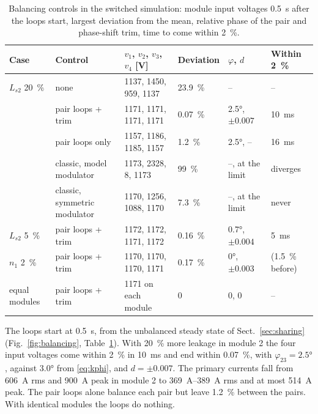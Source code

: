 \documentclass[10pt,a4paper]{scrartcl}
\begin{document}
\begin{onehalfspace}
\begin{table}[!htb]
\centering
\caption{Balancing controls in the switched simulation: module input voltages \SI{0.5}{s} after the loops start, largest deviation from the mean, relative phase of the pair and phase-shift trim, time to come within \SI{2}{\percent}.}
\label{tab:balancing}
\small
\begin{tabular}{@{}llllll@{}}
\toprule
Case & Control & $v_1$, $v_2$, $v_3$, $v_4$ [V] & Deviation & $\varphi$, $d$ & Within \SI{2}{\percent} \\
\midrule
$L_{s2}$ \SI{+20}{\percent} & none & 1137, 1450, 959, 1137 & \SI{23.9}{\percent} & -- & -- \\
 & pair loops + trim & 1171, 1171, 1171, 1171 & \SI{0.07}{\percent} & \ang{2.5}, $\pm 0.007$ & \SI{10}{ms} \\
 & pair loops only & 1157, 1186, 1185, 1157 & \SI{1.2}{\percent} & \ang{2.5}, -- & \SI{16}{ms} \\
 & classic, model modulator & 1173, 2328, 8, 1173 & \SI{99}{\percent} & --, at the limit & diverges \\
 & classic, symmetric modulator & 1170, 1256, 1088, 1170 & \SI{7.3}{\percent} & --, at the limit & never \\
$L_{s2}$ \SI{+5}{\percent} & pair loops + trim & 1172, 1172, 1171, 1172 & \SI{0.16}{\percent} & \ang{0.7}, $\pm 0.004$ & \SI{5}{ms} \\
$n_1$ \SI{+2}{\percent} & pair loops + trim & 1170, 1170, 1170, 1171 & \SI{0.17}{\percent} & \ang{0}, $\pm 0.003$ & (\SI{1.5}{\percent} before) \\
equal modules & pair loops + trim & 1171 on each module & 0 & 0, 0 & -- \\
\bottomrule
\end{tabular}
\end{table}

The loops start at \SI{0.5}{s}, from the unbalanced steady state of Sect.~\ref{sec:sharing} (Fig.~\ref{fig:balancing}, Table~\ref{tab:balancing}). With \SI{20}{\percent} more leakage in module 2 the four input voltages come within \SI{2}{\percent} in \SI{10}{ms} and end within \SI{0.07}{\percent}, with $\varphi_{23} = \ang{2.5}$, against \ang{3.0} from \eqref{eq:kphi}, and $d = \pm 0.007$. The primary currents fall from \SI{606}{A} rms and \SI{900}{A} peak in module 2 to \SIrange{369}{389}{A} rms and at most \SI{514}{A} peak. The pair loops alone balance each pair but leave \SI{1.2}{\percent} between the pairs. With identical modules the loops do nothing.


\end{onehalfspace}
\end{document}
